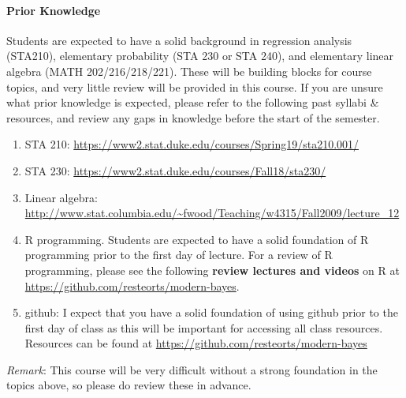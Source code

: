 \documentclass[11pt]{article}
\begin{document}
\paragraph{Prior Knowledge}
Students are expected to have a solid background in regression analysis (STA210), elementary probability (STA 230 or STA 240), and elementary linear algebra (MATH 202/216/218/221). These will be building blocks for course topics, and very little review will be provided in this course.  If you are unsure what prior knowledge is expected, please refer to the following past syllabi \& resources, and review any gaps in knowledge before the start of the semester. 
\begin{enumerate}
\item STA 210: \url{https://www2.stat.duke.edu/courses/Spring19/sta210.001/}
\item STA 230: \url{https://www2.stat.duke.edu/courses/Fall18/sta230/}
\item Linear algebra: \url{http://www.stat.columbia.edu/~fwood/Teaching/w4315/Fall2009/lecture_12}
\item R programming. Students are expected to have a solid foundation of R programming prior to the first day of lecture. For a review of R programming, please see the following \textbf{review lectures and videos} on R at \url{https://github.com/resteorts/modern-bayes}.
\item github: I expect that you have a solid foundation of using github prior to the first day of class as this will be important for accessing all class resources.  Resources can be found at \url{https://github.com/resteorts/modern-bayes}
\end{enumerate}
\emph{Remark}: This course will be very difficult without a strong foundation in the topics above, so please do review these in advance. 

\end{document}
